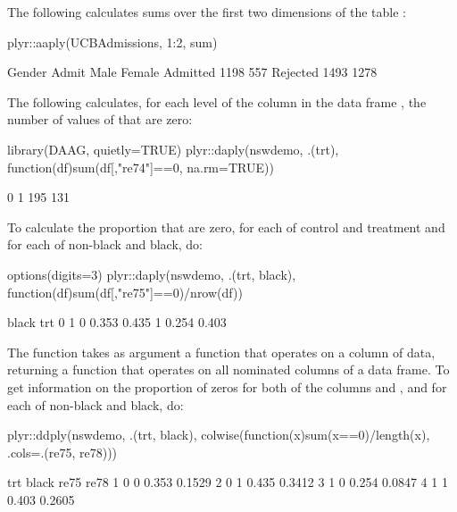 The following calculates sums over the first two dimensions of the
table :

\begin{Schunk}
\begin{Sinput}
plyr::aaply(UCBAdmissions, 1:2, sum)
\end{Sinput}
\begin{Soutput}
          Gender
Admit      Male Female
  Admitted 1198    557
  Rejected 1493   1278
\end{Soutput}
\end{Schunk}

The following calculates, for each level of the column 
in the data frame , the number of values of 
that are zero:
\begin{Schunk}
\begin{Sinput}
library(DAAG, quietly=TRUE)
plyr::daply(nswdemo, .(trt),
      function(df)sum(df[,"re74"]==0, na.rm=TRUE))
\end{Sinput}
\begin{Soutput}
  0   1 
195 131 
\end{Soutput}
\end{Schunk}
To calculate the proportion that are zero,   for each of control and treatment and
for each of non-black and black, do:
\begin{Schunk}
\begin{Sinput}
options(digits=3)
plyr::daply(nswdemo, .(trt, black),
      function(df)sum(df[,"re75"]==0)/nrow(df))
\end{Sinput}
\begin{Soutput}
   black
trt     0     1
  0 0.353 0.435
  1 0.254 0.403
\end{Soutput}
\end{Schunk}

The function  takes as argument a function that operates
on a column of data, returning a function that operates on all
nominated columns of a data frame.
To get information on the proportion of zeros for both of the columns
 and , and for each of non-black and black, do:
\begin{Schunk}
\begin{Sinput}
plyr::ddply(nswdemo, .(trt, black),
      colwise(function(x)sum(x==0)/length(x),
              .cols=.(re75, re78)))
\end{Sinput}
\begin{Soutput}
  trt black  re75   re78
1   0     0 0.353 0.1529
2   0     1 0.435 0.3412
3   1     0 0.254 0.0847
4   1     1 0.403 0.2605
\end{Soutput}
\end{Schunk}

